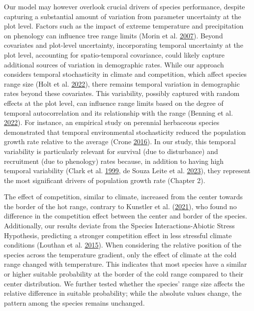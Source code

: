 \documentclass[12pt]{article}
\begin{document}
Our model may however overlook crucial drivers of species performance,
despite capturing a substantial amount of variation from parameter
uncertainty at the plot level. Factors such as the impact of extreme
temperature and precipitation on phenology can influence tree range
limits (Morin et al. \protect\hyperlink{ref-Morin2007}{2007}). Beyond
covariates and plot-level uncertainty, incorporating temporal
uncertainty at the plot level, accounting for spatio-temporal
covariance, could likely capture additional sources of variation in
demographic rates. While our approach considers temporal stochasticity
in climate and competition, which affect species range size (Holt et al.
\protect\hyperlink{ref-Holt2022}{2022}), there remains temporal
variation in demographic rates beyond these covariates. This
variability, possibly captured with random effects at the plot level,
can influence range limits based on the degree of temporal
autocorrelation and its relationship with the range (Benning et al.
\protect\hyperlink{ref-Benning2022}{2022}). For instance, an empirical
study on perennial herbaceous species demonstrated that temporal
environmental stochasticity reduced the population growth rate relative
to the average (Crone \protect\hyperlink{ref-Crone2016}{2016}). In our
study, this temporal variability is particularly relevant for survival
(due to disturbance) and recruitment (due to phenology) rates because,
in addition to having high temporal variability (Clark et al.
\protect\hyperlink{ref-Clark1999a}{1999}, de Souza Leite et al.
\protect\hyperlink{ref-Leite2023}{2023}), they represent the most
significant drivers of population growth rate (Chapter 2).

The effect of competition, similar to climate, increased from the center
towards the border of the hot range, contrary to Kunstler et al.
(\protect\hyperlink{ref-Kunstler2021}{2021}), who found no difference in
the competition effect between the center and border of the species.
Additionally, our results deviate from the Species Interactions-Abiotic
Stress Hypothesis, predicting a stronger competition effect in less
stressful climate conditions (Louthan et al.
\protect\hyperlink{ref-Louthan2015}{2015}). When considering the
relative position of the species across the temperature gradient, only
the effect of climate at the cold range changed with temperature. This
indicates that most species have a similar or higher suitable
probability at the border of the cold range compared to their center
distribution. We further tested whether the species' range size affects
the relative difference in suitable probability; while the absolute
values change, the pattern among the species remains unchanged.
\end{document}
